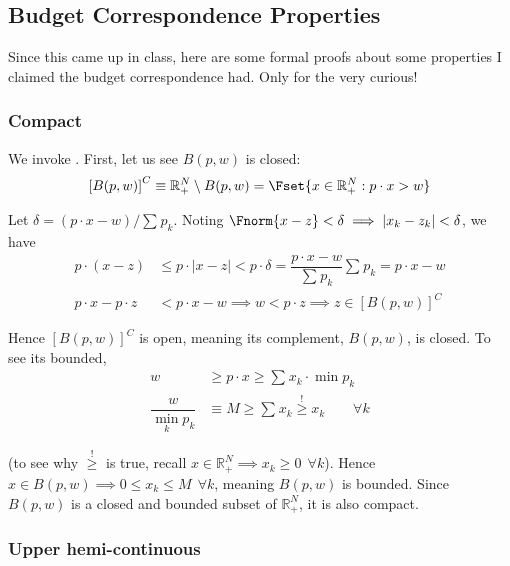 \documentclass{article}
\begin{document}
\subsection{Budget Correspondence Properties}
\label{sub:appendix_budget_correspondence_properties}

Since this came up in class, here are some formal proofs about some properties I claimed the budget correspondence had. Only for the very curious!

\subsubsection{Compact}
\label{ssub:appendix_compact}

We invoke . First, let us see $B(p, w)$ is closed:
\begin{align*}
  \left[B(p, w)\right]^C
  \equiv
  \mathbb{R}^N_+ \setminus B(p, w)
  =
  \Fset{
    x \in \mathbb{R}^N_+:
    p \cdot x > w
  }
\end{align*}

Let $\delta = (p \cdot x - w) / \sum^{}_{} p_k$. Noting $\Fnorm{x - z} < \delta \implies |x_k - z_k| < \delta$, we have
\begin{align*}
  p \cdot (x - z)
  &
  \le
  p \cdot |x - z|
  <
  p \cdot \delta
  =
  \dfrac{p \cdot x - w}{\sum^{}_{} p_k}
  \sum^{}_{} p_k
  =
  p \cdot x - w
  \\
  p \cdot x - p \cdot z
  &
  <
  p \cdot x - w
  \implies
  w
  <
  p \cdot z
  \implies
  z \in \left[B(p, w)\right]^C
\end{align*}

Hence $\left[B(p, w)\right]^C$ is open, meaning its complement, $B(p, w)$, is closed. To see its bounded,
\begin{align*}
  w
  &
  \ge
  p \cdot x
  \ge
  \sum^{}_{} x_k \cdot \min p_k
  \\
  \dfrac{w}{\min_k p_k}
  &
  \equiv
  M
  \ge
  \sum^{}_{} x_k
  \stackrel{!}{\ge}
  x_k
  \quad
  \quad
  \forall k
\end{align*}

(to see why $\stackrel{!}{\ge}$ is true, recall $x \in \mathbb{R}^N_+ \implies x_k \ge 0 ~~ \forall k$).  Hence $x \in B(p, w) \implies 0 \le x_k \le M ~~ \forall k$, meaning $B(p, w)$ is bounded. Since $B(p, w)$ is a closed and bounded subset of $\mathbb{R}^N_+$, it is also compact.

\subsubsection{Upper hemi-continuous}
\label{ssub:appendix_upper_hemi_continuous}
\end{document}
